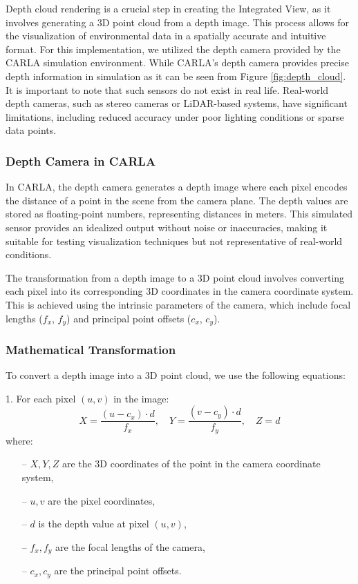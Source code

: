Depth cloud rendering is a crucial step in creating the Integrated View, as it involves generating a 3D point cloud from a depth image. This process allows for the visualization of environmental data in a spatially accurate and intuitive format. For this implementation, we utilized the depth camera provided by the CARLA simulation environment. While CARLA's depth camera provides precise depth information in simulation as it can be seen from Figure \ref{fig:depth_cloud}. It is important to note that such sensors do not exist in real life. Real-world depth cameras, such as stereo cameras or \ac{LiDAR}-based systems, have significant limitations, including reduced accuracy under poor lighting conditions or sparse data points.

\subsubsection{Depth Camera in CARLA}

In CARLA, the depth camera generates a depth image where each pixel encodes the distance of a point in the scene from the camera plane. The depth values are stored as floating-point numbers, representing distances in meters. This simulated sensor provides an idealized output without noise or inaccuracies, making it suitable for testing visualization techniques but not representative of real-world conditions.

The transformation from a depth image to a 3D point cloud involves converting each pixel into its corresponding 3D coordinates in the camera coordinate system. This is achieved using the intrinsic parameters of the camera, which include focal lengths (\(f_x\), \(f_y\)) and principal point offsets (\(c_x\), \(c_y\)).

\subsubsection{Mathematical Transformation}

To convert a depth image into a 3D point cloud, we use the following equations:

1. For each pixel \((u, v)\) in the image:
   \[
   X = \frac{(u - c_x) \cdot d}{f_x}, \quad
   Y = \frac{(v - c_y) \cdot d}{f_y}, \quad
   Z = d
   \]
   where:
   \begin{itemize}
    \item[--] \(X, Y, Z\) are the 3D coordinates of the point in the camera coordinate system,
    \item[--] \(u, v\) are the pixel coordinates,
    \item[--] \(d\) is the depth value at pixel \((u, v)\),
    \item[--] \(f_x, f_y\) are the focal lengths of the camera,
    \item[--] \(c_x, c_y\) are the principal point offsets.
   \end{itemize}

